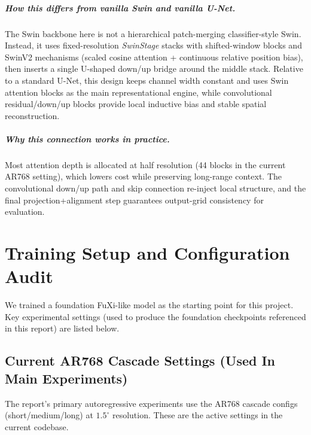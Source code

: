 \documentclass[12pt]{report}
\begin{document}
\paragraph{How this differs from vanilla Swin and vanilla U-Net.}
The Swin backbone here is not a hierarchical patch-merging classifier-style Swin. Instead, it uses fixed-resolution \emph{SwinStage} stacks with shifted-window blocks and SwinV2 mechanisms (scaled cosine attention + continuous relative position bias), then inserts a single U-shaped down/up bridge around the middle stack. Relative to a standard U-Net, this design keeps channel width constant and uses Swin attention blocks as the main representational engine, while convolutional residual/down/up blocks provide local inductive bias and stable spatial reconstruction.

\paragraph{Why this connection works in practice.}
Most attention depth is allocated at half resolution (44 blocks in the current AR768 setting), which lowers cost while preserving long-range context. The convolutional down/up path and skip connection re-inject local structure, and the final projection+alignment step guarantees output-grid consistency for evaluation.

\FloatBarrier

\chapter{Training Setup and Configuration Audit}

We trained a foundation FuXi-like model as the starting point for this project. Key experimental settings (used to produce the foundation checkpoints referenced in this report) are listed below.

\section{Current AR768 Cascade Settings (Used In Main Experiments)}

The report's primary autoregressive experiments use the AR768 cascade configs (short/medium/long) at $1.5^\circ$ resolution. These are the active settings in the current codebase.
\end{document}
